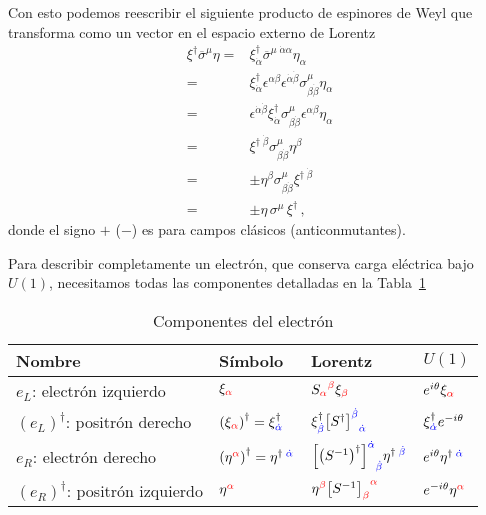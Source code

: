 Con esto podemos reescribir el siguiente producto de espinores  de Weyl que transforma como un vector en el espacio externo de Lorentz
\begin{align}
\label{eq:exxe}
  \xi^{\dagger}\overline{\sigma}^{\mu}\eta=& \xi^{\dagger}_{\dot{\alpha}}\overline{\sigma}^{\mu\;\dot{\alpha}\alpha}\eta_{\alpha}\nonumber\\
=&\xi^{\dagger}_{\dot{\alpha}}\epsilon^{\alpha\beta}\epsilon^{\dot{\alpha}\dot{\beta}}{\sigma}^{\mu}_{\beta\dot{\beta}} \eta_{\alpha}\nonumber\\
  =&\epsilon^{\dot{\alpha}\dot{\beta}}\xi^{\dagger}_{\dot{\alpha}}{\sigma}^{\mu}_{\beta\dot{\beta}} \epsilon^{\alpha\beta}\eta_{\alpha}\nonumber\\
  =&\xi^{\dagger\;\dot{\beta}}{\sigma}^{\mu}_{\beta\dot{\beta}} \eta^{\beta}\nonumber\\
  =&\pm\eta^{\beta}{\sigma}^{\mu}_{\beta\dot{\beta}}\xi^{\dagger\;\dot{\beta}} \nonumber\\
  =&\pm\eta\,{\sigma}^{\mu}\,\xi^{\dagger} \,,
\end{align}
donde el signo $+$ ($-$) es para campos clásicos (anticonmutantes).
\begin{frame}
Para describir completamente un electrón, que conserva carga eléctrica bajo $U(1)$, necesitamos todas las componentes detalladas en la Tabla~\ref{tab:electron}
\begin{table}
  \centering
  \begin{tabular}{llll}
    Nombre & Símbolo & Lorentz & $U(1)$\\\hline
    $e_L$: electrón {\color{red}izquierdo} & $\xi_{\color{red}\alpha}$ & ${S_{\color{red}\alpha}}^{\color{red}\beta}\xi_{\color{red}\beta}$ & $e^{i\theta}\xi_{\color{red}\alpha}$\\
   $\left( e_L \right)^{\dagger}$: positrón {\color{blue}derecho}   & $\left( \xi_{\color{red}\alpha} \right)^{\dagger}=\xi^{\dagger}_{\color{blue}\dot{\alpha}}$ & $\xi^{\dagger}_{\color{blue}\dot{\beta}}{\left[{S^{\dagger}}\right]^{\color{blue}\dot{\beta}}}_{\color{blue}\dot{\alpha}}$ & $\xi^{\dagger}_{\color{blue}\dot{\alpha}}e^{-i\theta}$\\
   $e_R$: electrón {\color{blue}derecho}   & $\left( \eta^{\color{red}\alpha} \right)^{\dagger}=\eta^{\dagger\;\color{blue}\dot{\alpha}}$ & ${\left[ \left( S^{-1} \right)^\dagger \right]^{\color{blue}\dot{\alpha}}}_{\color{blue}\dot{\beta}}\eta^{\dagger\;\color{blue}\dot{\beta}}$& $e^{i\theta}\eta^{\dagger\;\color{blue}\dot{\alpha}}$\\
   $\left( e_R \right)^{\dagger}$: positrón {\color{red}izquierdo}&$\eta^{\color{red}\alpha}$& $\eta^{\color{red}\beta}{\left[ S^{-1}  \right]_{\color{red}\beta}}^{\color{red}\alpha}$ & $e^{-i\theta}\eta^{\color{red}\alpha}$\\\hline
  \end{tabular}
  \caption{Componentes del electrón}
  \label{tab:electron}
\end{table}

\end{frame}
